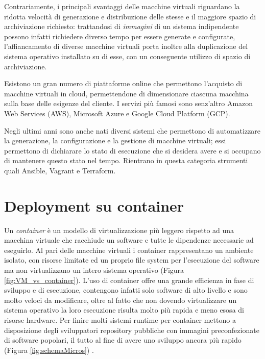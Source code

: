 	Contrariamente, i principali svantaggi delle macchine virtuali riguardano la ridotta velocità di generazione e distribuzione delle stesse e il maggiore spazio di archiviazione richiesto:
	trattandosi di \emph{immagini} di un sistema indipendente possono infatti richiedere diverso tempo per essere generate e configurate, l'affiancamento di diverse macchine virtuali porta inoltre alla duplicazione del sistema operativo installato su di esse, con un conseguente utilizzo di spazio di archiviazione.
	
	Esistono un gran numero di piattaforme online che permettono l'acquisto di macchine virtuali in cloud, permettendone di dimensionare ciascuna macchina sulla base delle esigenze del cliente.
	I servizi più famosi sono senz'altro Amazon Web Services (AWS), Microsoft Azure e Google Cloud Platform (GCP).
	
	Negli ultimi anni sono anche nati diversi sistemi che permettono di automatizzare la generazione, la configurazione e la gestione di macchine virtuali;
	essi permettono di dichiarare lo stato di esecuzione che si desidera avere e si occupano di mantenere questo stato nel tempo.
	Rientrano in questa categoria strumenti quali Ansible, Vagrant e Terraform.



\section{Deployment su container}
	
	\label{sec:depl_on_cont}
	Un \emph{container} è un modello di virtualizzazione più leggero rispetto ad una macchina virtuale che racchiude un software e tutte le dipendenze necessarie ad eseguirlo.
	Al pari delle macchine virtuali i container rappresentano un ambiente isolato, con risorse limitate ed un proprio file system per l'esecuzione del software ma non virtualizzano un intero sistema operativo (Figura \ref{fig:VM_vs_container}).
	L'uso di container offre una grande efficienza in fase di sviluppo  e di esecuzione, contengono infatti solo software di alto livello e sono molto veloci da modificare, oltre al fatto che non dovendo virtualizzare un sistema operativo la loro esecuzione risulta molto più rapida e meno esosa di risorse hardware.
	Per finire molti sistemi runtime per container mettono a disposizione degli sviluppatori repository pubbliche con immagini preconfezionate di software popolari, il tutto al fine di avere uno sviluppo ancora più rapido (Figura \ref{fig:schemaMicros})
	\cite{doc:kube, site:container_vs_VM}.
	
